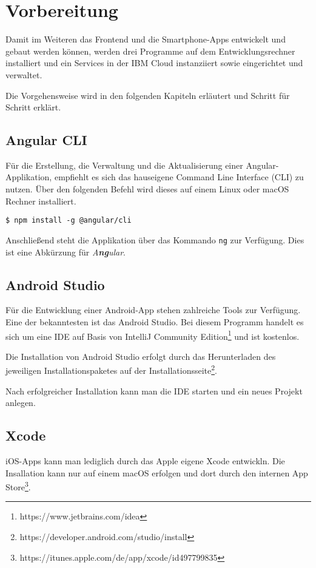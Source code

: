 \section{Vorbereitung}
Damit im Weiteren das Frontend und die Smartphone-Apps entwickelt und gebaut werden können, werden drei Programme auf
dem Entwicklungsrechner installiert und ein Services in der IBM Cloud instanziiert sowie eingerichtet und verwaltet.

Die Vorgehensweise wird in den folgenden Kapiteln erläutert und Schritt für Schritt erklärt.

\subsection{Angular CLI}
Für die Erstellung, die Verwaltung und die Aktualisierung einer Angular-Applikation, empfiehlt es sich das hauseigene
Command Line Interface (CLI) zu nutzen. Über den folgenden Befehl wird dieses auf einem Linux oder macOS Rechner
installiert.

\begin{lstlisting}[caption=Installation des Angular CLI, label=ls:vorbereitung_angularcli]
    $ npm install -g @angular/cli
\end{lstlisting}

Anschließend steht die Applikation über das Kommando \texttt{ng} zur Verfügung. Dies ist eine Abkürzung für
\textit{A\textbf{ng}ular}.

\subsection{Android Studio}
Für die Entwicklung einer Android-App stehen zahlreiche Tools zur Verfügung. Eine der bekanntesten ist das Android
Studio. Bei diesem Programm handelt es sich um eine IDE auf Basis von IntelliJ Community
Edition\footnote{https://www.jetbrains.com/idea} und ist kostenlos.

Die Installation von Android Studio erfolgt durch das Herunterladen des jeweiligen Installationspaketes auf der
Installationsseite\footnote{https://developer.android.com/studio/install}.

Nach erfolgreicher Installation kann man die IDE starten und ein neues Projekt anlegen.

\subsection{Xcode}
iOS-Apps kann man lediglich durch das Apple eigene Xcode entwickln. Die Insallation kann nur auf einem macOS
erfolgen und dort durch den internen App Store\footnote{https://itunes.apple.com/de/app/xcode/id497799835}.

